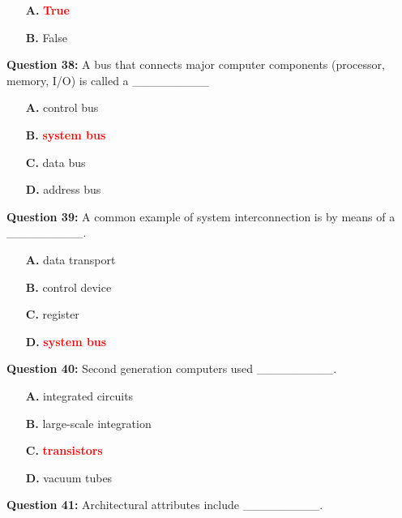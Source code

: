 \documentclass[12pt,a4paper]{article}
\begin{document}
\begin{itemize}
    \item[\textbf{A.}] \textcolor{red}{\textbf{True}}
    \item[\textbf{B.}] False
\end{itemize}

\vspace{0.5cm}

\textbf{Question 38:} A bus that connects major computer components (processor, memory, I/O) is called a _________

\begin{itemize}
    \item[\textbf{A.}] control bus
    \item[\textbf{B.}] \textcolor{red}{\textbf{system bus}}
    \item[\textbf{C.}] data bus
    \item[\textbf{D.}] address bus
\end{itemize}

\vspace{0.5cm}

\textbf{Question 39:} A common example of system interconnection is by means of a _________.

\begin{itemize}
    \item[\textbf{A.}] data transport
    \item[\textbf{B.}] control device
    \item[\textbf{C.}] register
    \item[\textbf{D.}] \textcolor{red}{\textbf{system bus}}
\end{itemize}

\vspace{0.5cm}

\textbf{Question 40:} Second generation computers used _________.

\begin{itemize}
    \item[\textbf{A.}] integrated circuits
    \item[\textbf{B.}] large-scale integration
    \item[\textbf{C.}] \textcolor{red}{\textbf{transistors}}
    \item[\textbf{D.}] vacuum tubes
\end{itemize}

\vspace{0.5cm}

\textbf{Question 41:} Architectural attributes include _________.
\end{document}
